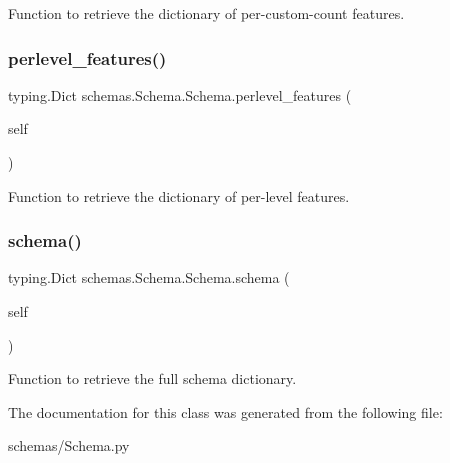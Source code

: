 Function to retrieve the dictionary of per-\/custom-\/count features. 

\mbox{\label{classschemas_1_1_schema_1_1_schema_aaa4cdb4eb5c81160ce964c035617471b}} 
\subsubsection{\texorpdfstring{perlevel\_features()}{perlevel\_features()}}
{\footnotesize\ttfamily  typing.\+Dict schemas.\+Schema.\+Schema.\+perlevel\+\_\+features (\begin{DoxyParamCaption}\item[{}]{self }\end{DoxyParamCaption})}



Function to retrieve the dictionary of per-\/level features. 

\mbox{\label{classschemas_1_1_schema_1_1_schema_af9a879ebb04be3449b986010fcbb70f1}} 
\subsubsection{\texorpdfstring{schema()}{schema()}}
{\footnotesize\ttfamily  typing.\+Dict schemas.\+Schema.\+Schema.\+schema (\begin{DoxyParamCaption}\item[{}]{self }\end{DoxyParamCaption})}



Function to retrieve the full schema dictionary. 



The documentation for this class was generated from the following file\+:\begin{DoxyCompactItemize}
\item 
schemas/Schema.\+py\end{DoxyCompactItemize}
